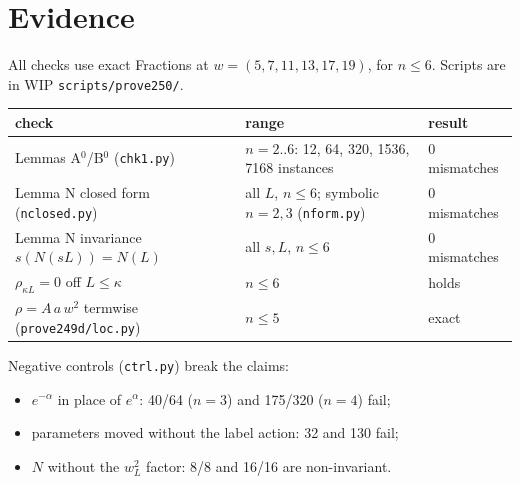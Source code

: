 \documentclass[11pt]{article}
\theoremstyle{remark}
\begin{document}
\section{Evidence}
All checks use exact Fractions at $w=(5,7,11,13,17,19)$, for $n\le6$. Scripts are in WIP \texttt{scripts/prove250/}.
\begin{center}\small
\begin{tabular}{lll}
\toprule
check & range & result\\
\midrule
Lemmas A$^0$/B$^0$ (\texttt{chk1.py}) & $n=2..6$: 12, 64, 320, 1536, 7168 instances & 0 mismatches\\
Lemma N closed form (\texttt{nclosed.py}) & all $L$, $n\le6$; symbolic $n=2,3$ (\texttt{nform.py}) & 0 mismatches\\
Lemma N invariance $s(N(sL))=N(L)$ & all $s,L$, $n\le6$ & 0 mismatches\\
$\rho_{\kappa L}=0$ off $L\le\kappa$ & $n\le6$ & holds\\
$\rho=A\,a\,w^2$ termwise (\texttt{prove249d/loc.py}) & $n\le5$ & exact\\
\bottomrule
\end{tabular}
\end{center}
Negative controls (\texttt{ctrl.py}) break the claims:
\begin{itemize}[leftmargin=*,itemsep=1pt]
\item $e^{-\alpha}$ in place of $e^{\alpha}$: 40/64 ($n=3$) and 175/320 ($n=4$) fail;
\item parameters moved without the label action: 32 and 130 fail;
\item $N$ without the $w_L^2$ factor: 8/8 and 16/16 are non-invariant.
\end{itemize}
\end{document}
